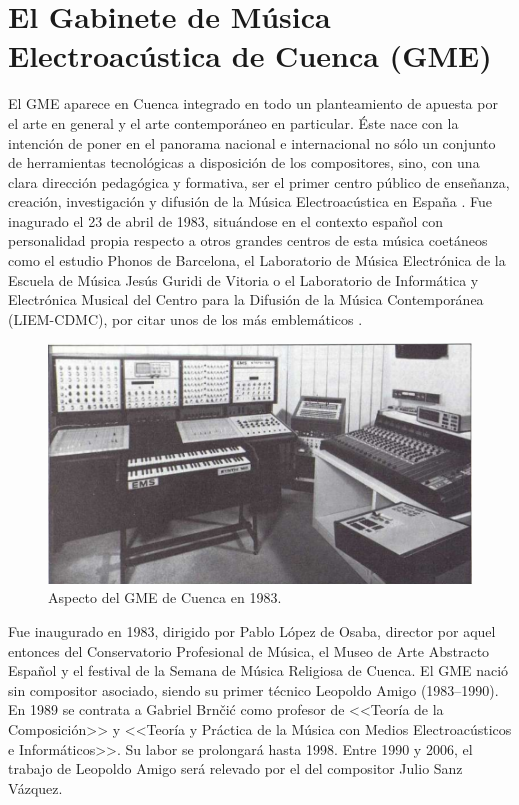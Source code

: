 \chapter{El Gabinete de Música Electroacústica de Cuenca (GME)}


El GME aparece en Cuenca integrado en todo un planteamiento de apuesta por el arte en general y el arte contemporáneo en particular. Éste nace con la intención de poner en el panorama nacional e internacional no sólo un conjunto de herramientas tecnológicas a disposición de los compositores, sino, con una clara dirección pedagógica y formativa, ser el primer centro público de enseñanza, creación, investigación y difusión de la Música Electroacústica en España \cite[p.~317]{GME}. Fue inagurado el 23 de abril de 1983, situándose en el contexto español con personalidad propia respecto a otros grandes centros de esta música coetáneos como el estudio Phonos de Barcelona, el Laboratorio de Música Electrónica de la Escuela de Música Jesús Guridi de Vitoria o el Laboratorio de Informática y Electrónica Musical del Centro para la Difusión de la Música Contemporánea (LIEM-CDMC), por citar unos de los más emblemáticos \cite{Supper}.

\begin{figure}
	\centering
	\includegraphics[width=1\textwidth]{GME_1984}
	\caption[Aspecto del GME de Cuenca en 1983.]{Aspecto del GME de Cuenca en 1983.}
	\label{fig:gme_1984}
\end{figure}

Fue inaugurado en 1983, dirigido por Pablo López de Osaba, director por aquel entonces del Conservatorio Profesional de Música, el Museo de Arte Abstracto Español y el festival de la Semana de Música Religiosa de Cuenca. El GME nació sin compositor asociado, siendo su primer técnico Leopoldo Amigo (1983--1990). En 1989 se contrata a Gabriel Brnčić como profesor de <<Teoría de la Composición>> y <<Teoría y Práctica de la Música con Medios Electroacústicos e Informáticos>>. Su labor se prolongará hasta 1998. Entre 1990 y 2006, el trabajo de Leopoldo Amigo será relevado por el del compositor Julio Sanz Vázquez. 

